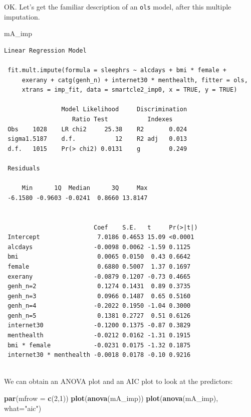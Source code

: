 \documentclass[]{book}
\newenvironment{Shaded}{\begin{snugshade}}{\end{snugshade}}
\newcommand{\KeywordTok}[1]{\textcolor[rgb]{0.13,0.29,0.53}{\textbf{#1}}}
\newcommand{\DataTypeTok}[1]{\textcolor[rgb]{0.13,0.29,0.53}{#1}}
\newcommand{\DecValTok}[1]{\textcolor[rgb]{0.00,0.00,0.81}{#1}}
\newcommand{\StringTok}[1]{\textcolor[rgb]{0.31,0.60,0.02}{#1}}
\newcommand{\NormalTok}[1]{#1}
\theoremstyle{definition}
\theoremstyle{definition}
\theoremstyle{definition}
\theoremstyle{remark}
\begin{document}
OK. Let's get the familiar description of an \texttt{ols} model, after
this multiple imputation.

\begin{Shaded}
\begin{Highlighting}[]
\NormalTok{mA_imp}
\end{Highlighting}
\end{Shaded}

\begin{verbatim}
Linear Regression Model
 
 fit.mult.impute(formula = sleephrs ~ alcdays + bmi * female + 
     exerany + catg(genh_n) + internet30 * menthealth, fitter = ols, 
     xtrans = imp_fit, data = smartcle2_imp0, x = TRUE, y = TRUE)
 
                Model Likelihood     Discrimination    
                   Ratio Test           Indexes        
 Obs    1028    LR chi2     25.38    R2       0.024    
 sigma1.5187    d.f.           12    R2 adj   0.013    
 d.f.   1015    Pr(> chi2) 0.0131    g        0.249    
 
 Residuals
 
     Min      1Q  Median      3Q     Max 
 -6.1580 -0.9603 -0.0241  0.8660 13.8147 
 
 
                         Coef    S.E.   t     Pr(>|t|)
 Intercept                7.0186 0.4653 15.09 <0.0001 
 alcdays                 -0.0098 0.0062 -1.59 0.1125  
 bmi                      0.0065 0.0150  0.43 0.6642  
 female                   0.6880 0.5007  1.37 0.1697  
 exerany                 -0.0879 0.1207 -0.73 0.4665  
 genh_n=2                 0.1274 0.1431  0.89 0.3735  
 genh_n=3                 0.0966 0.1487  0.65 0.5160  
 genh_n=4                -0.2022 0.1950 -1.04 0.3000  
 genh_n=5                 0.1381 0.2727  0.51 0.6126  
 internet30              -0.1200 0.1375 -0.87 0.3829  
 menthealth              -0.0212 0.0162 -1.31 0.1915  
 bmi * female            -0.0231 0.0175 -1.32 0.1875  
 internet30 * menthealth -0.0018 0.0178 -0.10 0.9216  
 
\end{verbatim}

We can obtain an ANOVA plot and an AIC plot to look at the predictors:

\begin{Shaded}
\begin{Highlighting}[]
\KeywordTok{par}\NormalTok{(}\DataTypeTok{mfrow =} \KeywordTok{c}\NormalTok{(}\DecValTok{2}\NormalTok{,}\DecValTok{1}\NormalTok{))}
\KeywordTok{plot}\NormalTok{(}\KeywordTok{anova}\NormalTok{(mA_imp))}
\KeywordTok{plot}\NormalTok{(}\KeywordTok{anova}\NormalTok{(mA_imp), }\DataTypeTok{what=}\StringTok{"aic"}\NormalTok{)}
\end{Highlighting}
\end{Shaded}
\end{document}
